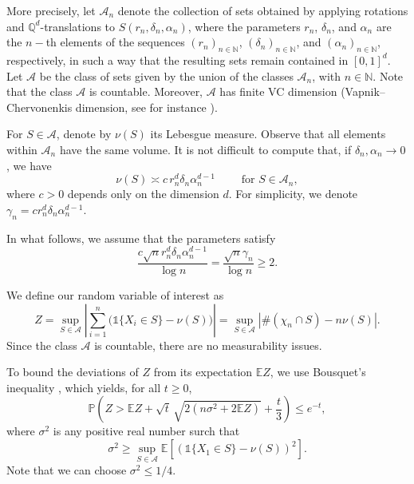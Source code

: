 \documentclass[11pt]{amsart}
\theoremstyle{definition}
\theoremstyle{remark}
\numberwithin{equation}{section}
\newcommand{\N}{{\mathbb N}}
\newcommand{\E}{\mathbb{E}}
\renewcommand{\P}{\mathbb{P}}
\begin{document}
More precisely, let $\mathcal{A}_n$ denote the collection of sets obtained by applying rotations and $\mathbb{Q}^d$-translations to $S(r_n,\delta_n,\alpha_n)$, where the parameters $r_n$, $\delta_n$, and $\alpha_n$ are the $n-$th elements of the sequences $(r_n)_{n\in\N}$, $(\delta_n)_{n\in\N}$, and $(\alpha_n)_{n\in\N}$, respectively, in such a way that the resulting sets remain contained in $[0,1]^d$.  
Let $\mathcal{A}$ be the class of sets given by the union of the classes $\mathcal{A}_n$, with $n\in\N$.  
Note that the class $\mathcal{A}$ is countable.  
Moreover, $\mathcal{A}$ has finite VC dimension (Vapnik--Chervonenkis dimension, see for instance \cite{BLM-concentration}).


For $S \in \mathcal{A}$, denote by $\nu(S)$ its Lebesgue measure. 
Observe that all elements within $\mathcal{A}_n$ have the same volume. 
It is not difficult to compute that, if  $\delta_n, \alpha_n \to 0$, we have
\[
\nu(S) \asymp c\, r_n^d \delta_n \alpha_n^{d-1} \qquad \text{ for }
S \in \mathcal{A}_n,
\]
where $c>0$ depends only on the dimension $d$. 
For simplicity, we denote $\gamma_n = c r_n^d \delta_n \alpha_n^{d-1}$.
%

In what follows, we assume that the parameters satisfy
\begin{equation}
\label{condicion.lemma1}
\frac{c\sqrt{n} r_n^d \delta_n \alpha_n^{d-1}}{\log n} 
= \frac{\sqrt{n} \gamma_n}{\log n}\geq 2.
\end{equation}

We define our random variable of interest as
\begin{equation}
\label{defZ}
Z = \sup_{S\in \mathcal{A}} \left|\sum_{i=1}^n  \big(\mathds{1}\{X_i\in S\} - \nu(S)\big) \right|
= 
\sup_{S\in \mathcal{A}} \left|\#(\chi_n \cap S) - n\nu(S)\right|.
\end{equation}
Since the class $\mathcal{A}$ is countable, there are no measurability issues.

To bound the deviations of $Z$ from its expectation $\E Z$, we use Bousquet's inequality \cite[Thm.~2.3]{Bousquet2002}, which yields, for all $t \ge 0$,
\begin{equation}
\label{Bousquet}
\P\!\left(Z > \E Z + \sqrt{t}\,\sqrt{2(n\sigma^2 + 2\E Z)} + \frac{t}{3}\right) 
\le 
e^{-t},
\end{equation}
where $\sigma^2$ is any positive real number surch that 
\[
\sigma^2 \ge \sup_{S\in \mathcal{A}} \E\!\left[(\mathds{1}\{X_1\in S\} - \nu(S))^2\right].
\]
Note that we can choose $\sigma^2 \le 1/4$.
\end{document}
